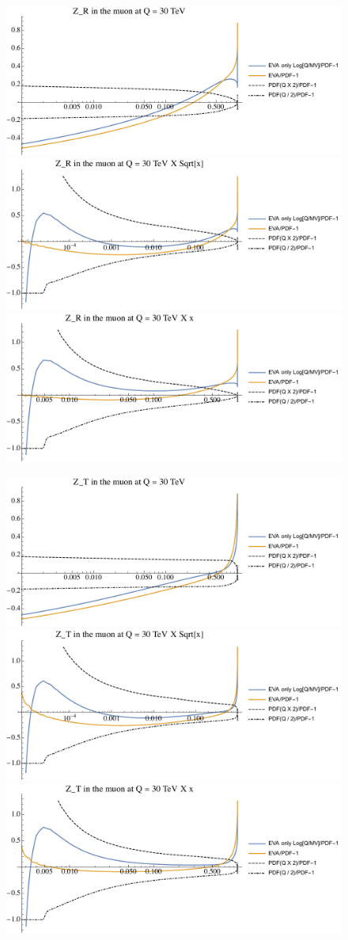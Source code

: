 \documentclass[a4paper,11pt]{article}
\begin{document}
\begin{figure}[ht]
\includegraphics[width=0.46\linewidth]{Notebooks/PlotPDFs/ratios/30TeV/Z_R_Q.pdf}
\includegraphics[width=0.46\linewidth]{Notebooks/PlotPDFs/ratios/30TeV/Z_R_Qsqrtx.pdf}
\includegraphics[width=0.46\linewidth]{Notebooks/PlotPDFs/ratios/30TeV/Z_R_Qx.pdf}
\end{figure}

\begin{figure}[ht]
\includegraphics[width=0.46\linewidth]{Notebooks/PlotPDFs/ratios/30TeV/Z_T_Q.pdf}
\includegraphics[width=0.46\linewidth]{Notebooks/PlotPDFs/ratios/30TeV/Z_T_Qsqrtx.pdf}
\includegraphics[width=0.46\linewidth]{Notebooks/PlotPDFs/ratios/30TeV/Z_T_Qx.pdf}
\end{figure}
\end{document}
